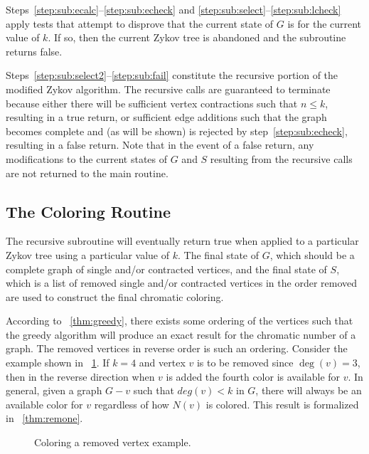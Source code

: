 Steps~\ref{step:sub:ecalc}--\ref{step:sub:echeck} and \ref{step:sub:select}--\ref{step:sub:lcheck} apply tests
that attempt to disprove that the current state of \(G\) is  for the current value of \(k\).  If so,
then the current Zykov tree is abandoned and the subroutine returns false.

Steps~\ref{step:sub:select2}--\ref{step:sub:fail} constitute the recursive portion of the modified Zykov algorithm.
The recursive calls are guaranteed to terminate because either there will be sufficient vertex contractions such
that \(n\le k\), resulting in a true return, or sufficient edge additions such that the graph becomes complete and
(as will be shown) is rejected by step~\ref{step:sub:echeck}, resulting in a false return.  Note that in the event
of a false return, any modifications to the current states of \(G\) and \(S\) resulting from the recursive calls
are not returned to the main routine.

\subsection{The Coloring Routine}\label{sec:sub:coloring}

The recursive subroutine will eventually return true when applied to a particular Zykov tree using a particular
value of \(k\).  The final state of \(G\), which should be a complete graph of single and/or contracted vertices,
and the final state of \(S\), which is a list of removed single and/or contracted vertices in the order removed are
used to construct the final chromatic coloring.

According to \theoremname~\ref{thm:greedy}, there exists some ordering of the vertices such that the greedy algorithm
will produce an exact result for the chromatic number of a graph.  The removed vertices in reverse order is
such an ordering.  Consider the example shown in \figurename~\ref{fig:reverse}.  If \(k=4\) and vertex \(v\) is to
be removed since \(\deg(v)=3\), then in the reverse direction when \(v\) is added the fourth color is available for
\(v\).  In general, given a graph \(G-v\) such that \(deg(v)<k\) in \(G\), there will always be an available color
for \(v\) regardless of how \(N(v)\) is colored.  This result is formalized in \theoremname~\ref{thm:remone}.

\begin{figure}[H]
  \centering
  \caption{Coloring a removed vertex example.}
  \label{fig:reverse}
\end{figure}

